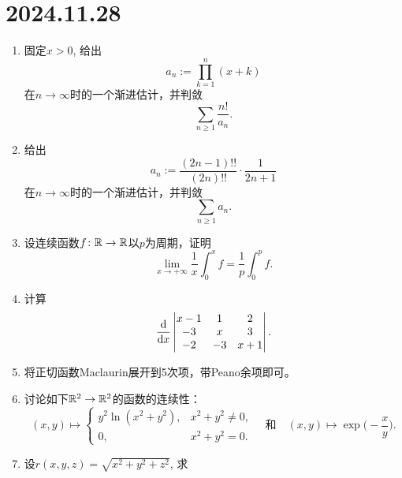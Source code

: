 \section*{2024.11.28}
\begin{enumerate}
    \item 固定$x>0$, 给出
    \begin{equation*}
        a_n:=\prod_{k=1}^n (x+k)
    \end{equation*}在$n\to \infty$时的一个渐进估计，并判敛
    \begin{equation*}
        \sum_{n\geqslant 1}\frac{n!}{a_n}.
    \end{equation*}
    \item 给出\begin{equation*}
        a_n:=\frac{(2n-1)!!}{(2n)!!}\cdot\frac{1}{2n+1}
    \end{equation*}在$n\to \infty$时的一个渐进估计，并判敛
    \begin{equation*}
        \sum_{n\geqslant 1}a_n.
    \end{equation*}
    \item 设连续函数$f\colon \mathbb{R}\to\mathbb{R}$以$p$为周期，证明
    \begin{equation*}
        \lim_{x\to +\infty}\frac{1}{x}\int_{0}^{x}f=\frac{1}{p}\int_{0}^{p}f.
    \end{equation*}
    \item 计算
    \begin{equation*}
        \frac{\mathop{}\!\mathrm{d}}{\mathop{}\!\mathrm{d} x}\begin{vmatrix}
            x-1 & 1 & 2 \\ -3 & x & 3 \\ -2 & -3 & x+1
        \end{vmatrix}.
    \end{equation*}
    \item 将正切函数Maclaurin展开到5次项，带Peano余项即可。
    \item 讨论如下$\mathbb{R}^2\to\mathbb{R}^2$的函数的连续性：
    \begin{equation*}
        (x,y)\mapsto \begin{cases}
            y^2\ln (x^2+y^2), & x^2+y^2\neq 0, \\
            0, & x^2+y^2= 0.
        \end{cases}\quad\text{和}\quad(x,y)\mapsto \exp\bigl(-\frac{x}{y}\bigr).
    \end{equation*}
    \item 设$r(x,y,z)=\sqrt{x^2+y^2+z^2}$, 求\begin{equation*}

\end{equation*}
\end{enumerate}
